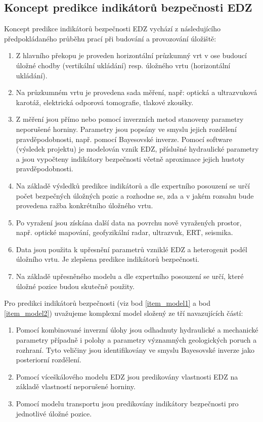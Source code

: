 \documentclass{article}
\begin{document}
\subsection{Koncept predikce indikátorů bezpečnosti EDZ}



Koncept predikce indikátorů bezpečnosti EDZ vychází z následujícího předpokládaného průběhu prací 
při budování a provozování úložiště:
\begin{enumerate}
    \item Z hlavního překopu je proveden horizontální průzkumný vrt v ose budoucí úložné chodby
        (vertikální ukládání) resp. úložného vrtu (horizontální ukládání).
    \item Na průzkumném vrtu je provedena sada měření, 
          např: optická a ultrazvuková karotáž, elektrická odporová tomografie, tlakové zkoušky.

    \item \label{item_model1}
        Z měření jsou přímo nebo pomocí inverzních metod stanoveny parametry neporušené horniny.
        Parametry jsou popsány ve smyslu jejich rozdělení pravděpodobnosti, 
        např. pomocí Bayesovské inverze. Pomocí software (výsledek projektu) je modelován vznik EDZ,
        příslušné hydraulické parametry a jsou vypočteny indikátory bezpečnosti včetně aproximace 
        jejich hustoty pravděpodobnosti.
    \item Na základě výsledků predikce indikátorů a dle expertního posouzení se určí počet bezpečných
        úložných pozic a rozhodne se, zda a v jakém rozsahu bude provedena ražba  konkrétního úložného vrtu.
    \item Po vyražení jsou získána další data na povrchu nově vyražených prostor, např. optické mapování, 
        geofyzikální radar, ultrazvuk, ERT, seismika. 
    \item Data jsou použita k upřesnění parametrů vzniklé EDZ a heterogenit podél úložního vrtu. 
        Je zlepšena predikce indikátorů bezpečnosti.  
    \item \label{item_model2}
        Na základě upřesněného modelu a dle expertního posouzení se určí, které úložné pozice budou 
        skutečně použity.
\end{enumerate}


Pro predikci indikátorů bezpečnosti (viz bod \ref{item_model1} 
a bod \ref{item_model2}) uvažujeme komplexní model složený ze tří navazujících částí: 
    \begin{enumerate}
    \item Pomocí kombinované inverzní úlohy jsou odhadnuty hydraulické a mechanické
     parametry  případně i polohy a parametry významných geologických poruch a rozhraní. 
     Tyto veličiny jsou identifikovány ve smyslu Bayesovské inverze jako posteriorní rozdělení.
    \item Pomocí víceškálového modelu EDZ jsou predikovány vlastnosti EDZ na základě vlastností neporušené horniny.
    \item Pomocí modelu transportu jsou predikovány indikátory bezpečnosti pro jednotlivé úložné pozice.
    \end{enumerate}
\end{document}

